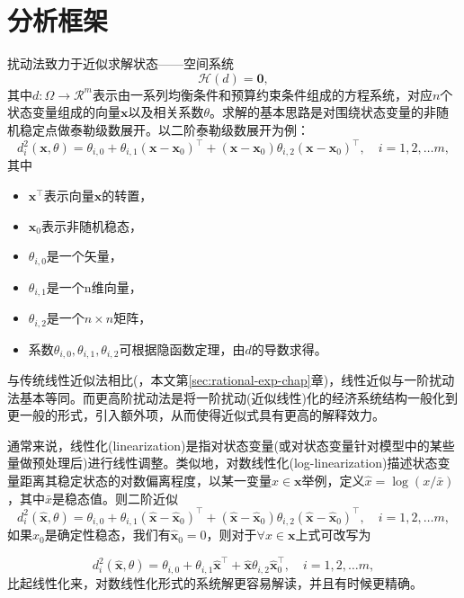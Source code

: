 \section{分析框架}
\label{sec:pta-perturbation-framework}
扰动法致力于近似求解状态——空间系统
\begin{equation}
  \label{sec:pta-problem-h}
  \mathcal{H}(d) = \bm{0},
\end{equation}
其中$d:\Omega \rightarrow \mathcal{R}^{m}$表示由一系列均衡条件和预算约束条件组成的方程系统，对应$n$个状态变量组成的向量$\bm{x}$以及相关系数$\theta$。求解的基本思路是对围绕状态变量的非随机稳定点做泰勒级数展开。以二阶泰勒级数展开为例：
\begin{equation}
  \label{eq:ptb-tse-2nd-example}
  d_i^2(\bm{x},\theta) = \theta_{i,0} + \theta_{i,1} (\bm{x}-\bm{x}_0)^{\top} +  (\bm{x}-\bm{x}_0) \theta_{i,2} (\bm{x}-\bm{x}_0)^{\top}, \quad i=1,2,\ldots m,
\end{equation}
其中
\begin{itemize}
  \item $\bm{x}^{\top}$表示向量$\bm{x}$的转置，
  \item $\bm{x}_0$表示非随机稳态，
  \item $\theta_{i,0}$是一个矢量，
  \item $\theta_{i,1}$是一个n维向量，
  \item $\theta_{i,2}$是一个$n \times n$矩阵，
  \item 系数$\theta_{i,0}, \theta_{i,1}, \theta_{i,2}$可根据隐函数定理，由$d$的导数求得。
\end{itemize}

与传统线性近似法相比(\citep{King:1988bk,King:1988kf,King:2002ih}，本文第\ref{sec:rational-exp-chap}章)，线性近似与一阶扰动法基本等同。而更高阶扰动法是将一阶扰动(近似线性)化的经济系统结构一般化到更一般的形式，引入额外项，从而使得近似式具有更高的解释效力。
\begin{remark}[扰动法的线性化和对数线性化]
  \label{remark:loglinearization}
  通常来说，线性化(linearization)是指对状态变量(或对状态变量针对模型中的某些量做预处理后)进行线性调整。类似地，对数线性化(log-linearization)描述状态变量距离其稳定状态的对数偏离程度，以某一变量$x \in \bm{x}$举例，定义$\hat{x} = \log \left(x / \bar{x} \right)$，其中$\bar{x}$是稳态值。则二阶近似
  \begin{equation*}
    d_i^2(\hat{\bm{x}},\theta) = \theta_{i,0} + \theta_{i,1} (\hat{\bm{x}} - \hat{\bm{x}}_0)^{\top} +  (\hat{\bm{x}} - \hat{\bm{x}}_0) \theta_{i,2} (\hat{\bm{x}} - \hat{\bm{x}}_0)^{\top}, \quad i=1,2,\ldots m,
  \end{equation*}
  如果$x_0$是确定性稳态，我们有$\hat{\bm{x}}_0 = 0$，则对于$\forall x \in \bm{x}$上式可改写为

  \begin{equation*}
      d_i^2(\hat{\bm{x}},\theta) = \theta_{i,0} + \theta_{i,1} \hat{\bm{x}}^{\top} +  \hat{\bm{x}} \theta_{i,2} \hat{\bm{x}}_0^{\top}, \quad i=1,2,\ldots m,
  \end{equation*}
  比起线性化来，对数线性化形式的系统解更容易解读，并且有时候更精确。
\end{remark}

